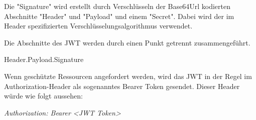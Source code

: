 Die "Signature" wird erstellt durch Verschlüsseln der Base64Url kodierten Abschnitte "Header" und "Payload" und einem "Secret". 
Dabei wird der im Header spezifizierten Verschlüsselungsalgorithmus verwendet.

Die Abschnitte des JWT werden durch einen Punkt getrennt zusammengeführt. 

{\ttfamily Header.Payload.Signature}

Wenn geschützte Ressourcen angefordert werden, wird das JWT in der Regel im Authorization-Header als sogenanntes Bearer Token gesendet. Dieser Header würde wie folgt aussehen:

\emph{Authorization: Bearer \textless JWT Token\textgreater}

\cite{Auth0JWT}
\cite{RFC7519}
\cite{WdsJWT}